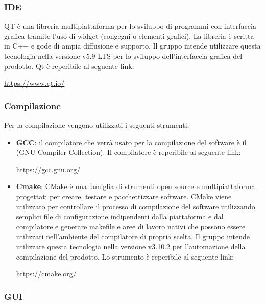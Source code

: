 \documentclass[../NormediProgetto.tex]{subfiles}
\begin{document}
	\subsubsection{IDE}

	QT è una libreria multipiattaforma per lo sviluppo di programmi con interfaccia grafica tramite l'uso di widget (congegni o elementi grafici). La libreria è scritta in C++ e gode di ampia diffusione e supporto. Il gruppo intende utilizzare questa tecnologia nella versione v5.9 LTS per lo sviluppo dell'interfaccia grafica del prodotto. Qt è reperibile al seguente link:
	\begin{center}
		\centerline{\url{https://www.qt.io/}}
	\end{center}

	\subsubsection{Compilazione}

	Per la compilazione vengono utilizzati i seguenti strumenti:

	\begin{itemize}
		\item \textbf{GCC}: il compilatore che verrà usato per la compilazione del software è il  (GNU Compiler Collection). Il compilatore è reperibile al seguente link:
		\begin{center}
			\centerline{\url{https://gcc.gnu.org/}}
		\end{center}
	
		\item \textbf{Cmake}: CMake è una famiglia di strumenti open source e multipiattaforma progettati per creare, testare e pacchettizzare software. CMake viene utilizzato per controllare il processo di compilazione del software utilizzando semplici file di configurazione indipendenti dalla piattaforma e dal compilatore e generare makefile e aree di lavoro nativi che possono essere utilizzati nell'ambiente del compilatore di propria scelta. Il gruppo intende utilizzare questa tecnologia nella versione v3.10.2 per l’automazione della compilazione del prodotto. Lo strumento è reperibile al seguente link:
		\begin{center}
			\centerline{\url{https://cmake.org/}}
		\end{center}
	
	\end{itemize}

	\subsubsection{GUI}
\end{document}
